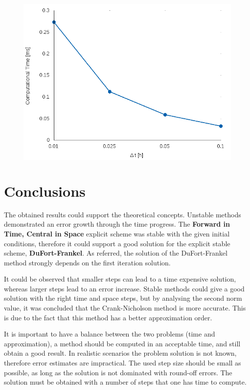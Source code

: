 \documentclass[12pt]{article}
\begin{document}
\begin{figure}[!htb]
  \centering
  \includegraphics[width=.6\linewidth]{laasonen_times.png}
\end{figure}

\pagebreak
\section*{Conclusions}

\par The obtained results could support the theoretical concepts. Unstable methods demonstrated an error growth through the time progress. The \textbf{Forward in Time, Central in Space} explicit scheme was stable with the given initial conditions, therefore it could support a good solution for the explicit stable scheme, \textbf{DuFort-Frankel}. As referred, the solution of the DuFort-Frankel method strongly depends on the first iteration solution.
\par It could be observed that smaller steps can lead to a time expensive solution, whereas larger steps lead to an error increase. Stable methods could give a good solution with the right time and space steps, but by analysing the second norm value, it was concluded that the Crank-Nicholson method is more accurate. This is due to the fact that this method has a better approximation order.
\par It is important to have a balance between the two problems (time and approximation), a method should be computed in an acceptable time, and still obtain a good result. In realistic scenarios the problem solution is not known, therefore error estimates are impractical. The used step size should be small as possible, as long as the solution is not dominated with round-off errors. The solution must be obtained with a number of steps that one has time to compute. 
 
\end{document}
